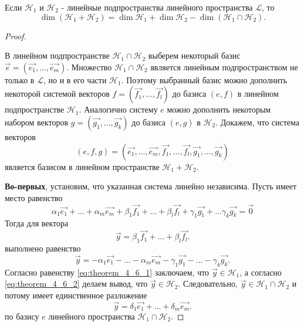 \begin{theorem}
    Если $\mathcal{H}_1$ и $\mathcal{H}_2$ - линейные подпространства линейного пространства $\mathcal{L}$, то
    $$\dim(\mathcal{H}_1 + \mathcal{H}_2) = \dim\mathcal{H}_1 + \dim\mathcal{H}_2 - \dim(\mathcal{H}_1 \cap \mathcal{H}_2).$$
    \label{thm:theorem_4_6}
\end{theorem}

\begin{proof}~

    В линейном подпространстве $\mathcal{H}_1 \cap \mathcal{H}_2$ выберем некоторый базис $\vec{e} = (\vec{e_1}, \ldots, \vec{e_m})$. Множество $\mathcal{H}_1 \cap \mathcal{H}_2$ является линейным подпространством не только в $\mathcal{L}$, но и в его части $\mathcal{H}_1$. Поэтому выбранный базис можно дополнить некоторой системой векторов $f = (\vec{f_1}, \ldots, \vec{f_l})$ до базиса $(e, f)$ в линейном подпространстве $\mathcal{H}_1$. Аналогично систему $e$ можно дополнить некоторым набором векторов $g = (\vec{g_1}, \ldots, \vec{g_k})$ до базиса $(e, g)$ в $\mathcal{H}_2$. Докажем, что система векторов
    $$(e, f, g) = (\vec{e_1}, \ldots, \vec{e_m}, \vec{f_1}, \ldots, \vec{f_l}, \vec{g_1}, \ldots, \vec{g_k})$$
    является базисом в линейном пространстве $\mathcal{H}_1 + \mathcal{H}_2$.

    \textbf{Во-первых}, установим, что указанная система линейно независима. Пусть имеет место равенство
    $$\alpha_1\vec{e_1} + \ldots + \alpha_m\vec{e_m} + \beta_1\vec{f_1} + \ldots + \beta_l\vec{f_l} + \gamma_1\vec{g_1} + \ldots \gamma_k\vec{g_k} = \vec{0}$$
    Тогда для вектора
    \begin{equation}
        \vec{y} = \beta_1\vec{f_1} + \ldots + \beta_l\vec{f_l}.
        \label{eq:theorem_4_6_1}
    \end{equation}
    выполнено равенство
    \begin{equation}
        \vec{y} = -\alpha_1\vec{e_1} - \ldots -\alpha_m\vec{e_m} - \gamma_1\vec{g_1} - \ldots - \gamma_k\vec{g_k}.
        \label{eq:theorem_4_6_2}
    \end{equation}
    Согласно равенству \eqref{eq:theorem_4_6_1} заключаем, что $\vec{y} \in \mathcal{H}_1$, а согласно \eqref{eq:theorem_4_6_2} делаем вывод, что $\vec{y} \in \mathcal{H}_2$. Следовательно, $\vec{y} \in \mathcal{H}_1 \cap \mathcal{H}_2$ и потому имеет единственное разложение
    \begin{equation}
        \vec{y} = \delta_1\vec{e_1} + \ldots + \delta_m\vec{e_m}.
        \label{fig:theorem_4_6_3}
    \end{equation}
    по базису $e$ линейного пространства $\mathcal{H}_1 \cap \mathcal{H}_2$.


\end{proof}
